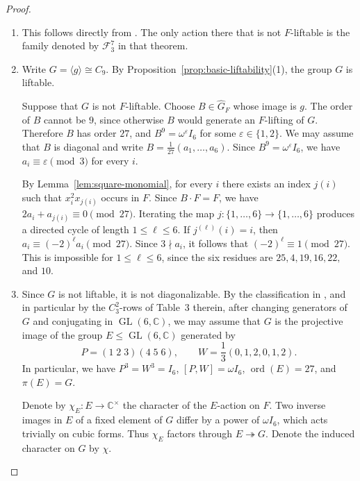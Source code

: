 \documentclass[12pt]{amsart}
\numberwithin{equation}{section}
\theoremstyle{plain}
\theoremstyle{definition}
\theoremstyle{remark}
\newcommand{\CC}{\mathbb C}
\newcommand{\calF}{\mathcal F}
\DeclareMathOperator{\GL}{GL}
\begin{document}
\begin{proof}

\begin{enumerate}

\item This follows directly from
\cite[Theorem~3.8]{gonzalez2011automorphisms}.  The only action there that
is not $F$-liftable is the family denoted by $\calF_3^7$ in that theorem.

\item Write $G=\langle g\rangle\cong C_9$.  By
Proposition~\ref{prop:basic-liftability}(1), the group $G$ is liftable.

Suppose that $G$ is not $F$-liftable.  Choose
$B\in\widehat G_F$ whose image is $g$.  The order of $B$
cannot be $9$, since otherwise $B$ would generate an $F$-lifting of $G$.
Therefore $B$ has order $27$, and
$B^9=\omega^\varepsilon I_6$ for some $\varepsilon\in\{1,2\}$.  We may
assume that $B$ is diagonal and write
$B=\frac{1}{27}(a_1,\ldots,a_6)$.  Since
$B^9=\omega^\varepsilon I_6$, we have
$a_i\equiv\varepsilon\pmod 3$ for every $i$.

By Lemma~\ref{lem:square-monomial}, for every $i$ there
exists an index $j(i)$ such that $x_i^2x_{j(i)}$ occurs
in $F$.  Since $B\cdot F=F$, we have
$2a_i+a_{j(i)}\equiv0\pmod{27}$.  Iterating the map
$j\colon\{1,\ldots,6\}\to\{1,\ldots,6\}$ produces a directed cycle of
length $1\leq\ell\leq6$.  If $j^{(\ell)}(i)=i$, then
$a_i\equiv(-2)^\ell a_i\pmod{27}$.  Since $3\nmid a_i$, it follows that
$(-2)^\ell\equiv1\pmod{27}$.  This is impossible for
$1\leq\ell\leq6$, since the six residues are
$25,4,19,16,22,$ and $10$.

\item
Since $G$ is not liftable, it is not diagonalizable.
By the classification in
\cite[Corollary~2, Theorems~3 and~4]
{mayanskiy2013abelianautomorphismgroupscubic},
and in particular by the $C_3^2$-rows of Table~3 therein,
after changing generators of $G$ and conjugating in
$\GL(6,\CC)$, we may assume that $G$ is the projective
image of the group $E\leq\GL(6,\CC)$ generated by
\[
P=(1\;2\;3)(4\;5\;6),
\qquad
W=\frac13(0,1,2,0,1,2).
\]
In particular, we have $P^3=W^3=I_6$,
$[P,W]=\omega I_6$, $\operatorname{ord}(E)=27$, and $\pi(E)=G$.

Denote by $\chi_E:E\to \CC^\times$ the character of the $E$-action on
$F$.  Two inverse images in $E$ of a fixed element of $G$ differ by a power
of $\omega I_6$, which acts trivially on cubic forms.  Thus $\chi_E$
factors through $E\twoheadrightarrow G$.  Denote the induced character on
$G$ by $\chi$.


\end{enumerate}
\end{proof}
\end{document}

